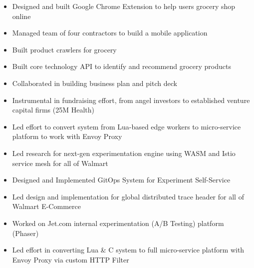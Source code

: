 \documentclass[10pt,a4paper,ragged2e,withhyper]{altacv}
\begin{document}
\begin{paracol}{2}

  \begin{itemize}
    \item Designed and built Google Chrome Extension to help users grocery shop online
    \item Managed team of four contractors to build a mobile application
    \item Built product crawlers for grocery
    \item Built core technology API to identify and recommend grocery products
    \item Collaborated in building business plan and pitch deck
    \item Instrumental in fundraising effort, from angel investors to established venture capital firms (25M Health)
  \end{itemize}

  \divider

  \begin{itemize}
    \item Led effort to convert system from Lua-based edge workers to micro-service platform to work with Envoy Proxy
    \item Led research for next-gen experimentation engine using WASM and Istio service mesh for all of Walmart %
    \item Designed and Implemented GitOps System for Experiment Self-Service
    \item Led design and implementation for global distributed trace header for all of Walmart E-Commerce %
  \end{itemize}

  \divider

  \begin{itemize}
    \item Worked on Jet.com internal experimentation (A/B Testing) platform (Phaser)
    \item Led effort in converting Lua \& C system to full micro-service platform with Envoy Proxy via custom HTTP Filter
  \end{itemize}


\end{paracol}
\end{document}
